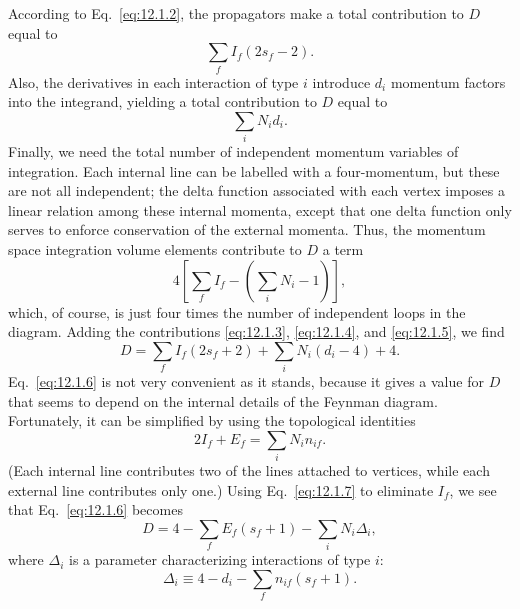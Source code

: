 According to Eq.~\eqref{eq:12.1.2}, the propagators make a total contribution
to $D$ equal to
\begin{equation}
  \sum_f I_f(2s_f-2).
  \tag{12.1.3}\label{eq:12.1.3}
\end{equation}
Also, the derivatives in each interaction of type $i$ introduce $d_i$
momentum factors into the integrand, yielding a total contribution to $D$
equal to
\begin{equation}
  \sum_i N_i d_i.
  \tag{12.1.4}\label{eq:12.1.4}
\end{equation}
Finally, we need the total number of independent momentum variables of
integration. Each internal line can be labelled with a four-momentum, but
these are not all independent; the delta function associated with each vertex
imposes a linear relation among these internal momenta, except that one delta
function only serves to enforce conservation of the external momenta. Thus,
the momentum space integration volume elements contribute to $D$ a term
\begin{equation}
  4\left[\sum_f I_f-\left(\sum_i N_i-1\right)\right],
  \tag{12.1.5}\label{eq:12.1.5}
\end{equation}
which, of course, is just four times the number of independent loops in the
diagram. Adding the contributions \eqref{eq:12.1.3}, \eqref{eq:12.1.4}, and
\eqref{eq:12.1.5}, we find
\begin{equation}
  D=\sum_f I_f(2s_f+2)+\sum_i N_i(d_i-4)+4.
  \tag{12.1.6}\label{eq:12.1.6}
\end{equation}
Eq.~\eqref{eq:12.1.6} is not very convenient as it stands, because it gives a
value for $D$ that seems to depend on the internal details of the Feynman
diagram. Fortunately, it can be simplified by using the topological identities
\begin{equation}
  2I_f+E_f=\sum_i N_i n_{if}.
  \tag{12.1.7}\label{eq:12.1.7}
\end{equation}
(Each internal line contributes two of the lines attached to vertices, while
each external line contributes only one.) Using Eq.~\eqref{eq:12.1.7} to
eliminate $I_f$, we see that Eq.~\eqref{eq:12.1.6} becomes
\begin{equation}
  D=4-\sum_f E_f(s_f+1)-\sum_i N_i\Delta_i,
  \tag{12.1.8}\label{eq:12.1.8}
\end{equation}
where $\Delta_i$ is a parameter characterizing interactions of type $i$:
\begin{equation}
  \Delta_i\equiv 4-d_i-\sum_f n_{if}(s_f+1).
  \tag{12.1.9}\label{eq:12.1.9}
\end{equation}

